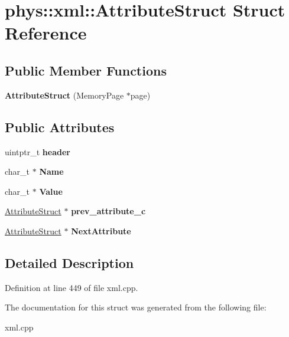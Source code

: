 \hypertarget{structphys_1_1xml_1_1AttributeStruct}{
\section{phys::xml::AttributeStruct Struct Reference}
\label{dd/dfe/structphys_1_1xml_1_1AttributeStruct}
}
\subsection*{Public Member Functions}
\begin{DoxyCompactItemize}
\item 
\hypertarget{structphys_1_1xml_1_1AttributeStruct_ae56b37b04de2de9b06f2ab62063860d0}{
{\bfseries AttributeStruct} (MemoryPage $\ast$page)}
\label{dd/dfe/structphys_1_1xml_1_1AttributeStruct_ae56b37b04de2de9b06f2ab62063860d0}

\end{DoxyCompactItemize}
\subsection*{Public Attributes}
\begin{DoxyCompactItemize}
\item 
\hypertarget{structphys_1_1xml_1_1AttributeStruct_a9fd6577532fd75614cbbeef25ebc483d}{
uintptr\_\-t {\bfseries header}}
\label{dd/dfe/structphys_1_1xml_1_1AttributeStruct_a9fd6577532fd75614cbbeef25ebc483d}

\item 
\hypertarget{structphys_1_1xml_1_1AttributeStruct_af33547ea3e8c21d16737fc7ebcb94c95}{
char\_\-t $\ast$ {\bfseries Name}}
\label{dd/dfe/structphys_1_1xml_1_1AttributeStruct_af33547ea3e8c21d16737fc7ebcb94c95}

\item 
\hypertarget{structphys_1_1xml_1_1AttributeStruct_a2a7018296eb97ef342b5230d59f6e6ee}{
char\_\-t $\ast$ {\bfseries Value}}
\label{dd/dfe/structphys_1_1xml_1_1AttributeStruct_a2a7018296eb97ef342b5230d59f6e6ee}

\item 
\hypertarget{structphys_1_1xml_1_1AttributeStruct_ad37be3bf8c8d5a469396e882af402f89}{
\hyperlink{structphys_1_1xml_1_1AttributeStruct}{AttributeStruct} $\ast$ {\bfseries prev\_\-attribute\_\-c}}
\label{dd/dfe/structphys_1_1xml_1_1AttributeStruct_ad37be3bf8c8d5a469396e882af402f89}

\item 
\hypertarget{structphys_1_1xml_1_1AttributeStruct_a7e09b9d6ab866d16c1c1b5ec9aa4662f}{
\hyperlink{structphys_1_1xml_1_1AttributeStruct}{AttributeStruct} $\ast$ {\bfseries NextAttribute}}
\label{dd/dfe/structphys_1_1xml_1_1AttributeStruct_a7e09b9d6ab866d16c1c1b5ec9aa4662f}

\end{DoxyCompactItemize}


\subsection{Detailed Description}


Definition at line 449 of file xml.cpp.



The documentation for this struct was generated from the following file:\begin{DoxyCompactItemize}
\item 
xml.cpp\end{DoxyCompactItemize}
